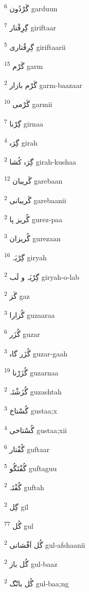 \documentclass[12pt]{article}
\begin{document}
\begin{RTL}
\begin{multicols}{5}
{\ur گَرْدُون}   \textsuperscript{6} garduun

{\ur گِرِفْتار}   \textsuperscript{7} giriftaar

{\ur گِرِفْتاری}   \textsuperscript{5} giriftaarii

{\ur گَرْم}   \textsuperscript{15} garm

{\ur گَرْم بازار}   \textsuperscript{2} garm-baazaar

{\ur گَرْمی}   \textsuperscript{10} garmii

{\ur گِرْنا}   \textsuperscript{7} girnaa

{\ur گِرَہ}   \textsuperscript{4} girah

{\ur گِرَہ کُشا}   \textsuperscript{2} girah-kushaa

{\ur گَریبان}   \textsuperscript{12} garebaan

{\ur گَریبانی}   \textsuperscript{2} garebaanii

{\ur گُریز پا}   \textsuperscript{2} gurez-paa

{\ur گُریزان}   \textsuperscript{3} gurezaan

{\ur گِرْیَہ}   \textsuperscript{16} giryah

{\ur گِرْیَہ و لَب}   \textsuperscript{2} giryah-o-lab

{\ur گَز}   \textsuperscript{2} gaz

{\ur گُزارا}   \textsuperscript{3} guzaaraa

{\ur گُزَر}   \textsuperscript{6} guzar

{\ur گُزَر گاہ}   \textsuperscript{3} guzar-gaah

{\ur گُزَرْنا}   \textsuperscript{19} guzarnaa

{\ur گُزَشْتَہ}   \textsuperscript{2} guzashtah

{\ur گُسْتاخ}   \textsuperscript{3} gustaa;x

{\ur گُسْتاخی}   \textsuperscript{4} gustaa;xii

{\ur گُفْتار}   \textsuperscript{6} guftaar

{\ur گُفْتَگُو}   \textsuperscript{5} guftaguu

{\ur گُفْتَہ}   \textsuperscript{2} guftah

{\ur گِل}   \textsuperscript{2} gil

{\ur گُل}   \textsuperscript{77} gul

{\ur گُل اَفْشانی}   \textsuperscript{2} gul-afshaanii

{\ur گُل باز}   \textsuperscript{2} gul-baaz

{\ur گُل بانْگ}   \textsuperscript{2} gul-baa;ng


\end{multicols}
\end{RTL}
\end{document}

